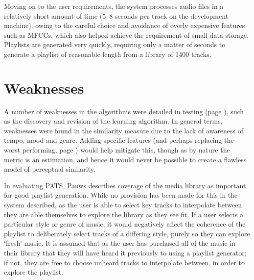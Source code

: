 Moving on to the user requirements, the system processes audio files in a relatively short amount of time (5--8 seconds per track on the development machine), owing to the careful choice and avoidance of overly expensive features such as MFCCs, which also helped achieve the requirement of small data storage. Playlists are generated very quickly, requiring only a matter of seconds to generate a playlist of reasonable length from a library of 1400 tracks.
\section{Weaknesses}
A number of weaknesses in the algorithms were detailed in testing (page \pageref{text:testing}), such as the discovery and revision of the learning algorithm. In general terms, weaknesses were found in the similarity measure due to the lack of awareness of tempo, mood and genre. Adding specific features (and perhaps replacing the worst performing, page \pageref{text:testing:functional:learner}) would help mitigate this, though as by nature the metric is an estimation, and hence it would never be possible to create a flawless model of perceptual similarity.

In evaluating PATS, Pauws describes coverage of the media library as important for good playlist generation. While no provision has been made for this in the system described, as the user is able to select key tracks to interpolate between they are able themselves to explore the library as they see fit. If a user selects a particular style or genre of music, it would negatively affect the coherence of the playlist to deliberately select tracks of a differing style, purely so they can explore `fresh' music. It is assumed that as the user has purchased all of the music in their library that they will have heard it previously to using a playlist generator; if not, they are free to choose unheard tracks to interpolate between, in order to explore the playlist.


